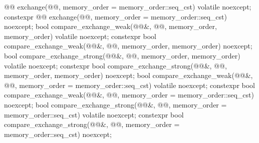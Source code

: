 \begin{codeblock}
{{    @@ exchange(@@,
                           memory_order = memory_order::seq_cst) volatile noexcept;
    constexpr @@ exchange(@@,
                           memory_order = memory_order::seq_cst) noexcept;
    bool compare_exchange_weak(@@&, @@,
                               memory_order, memory_order) volatile noexcept;
    constexpr bool compare_exchange_weak(@@&, @@,
                               memory_order, memory_order) noexcept;
    bool compare_exchange_strong(@@&, @@,
                                 memory_order, memory_order) volatile noexcept;
    constexpr bool compare_exchange_strong(@@&, @@,
                                 memory_order, memory_order) noexcept;
    bool compare_exchange_weak(@@&, @@,
                               memory_order = memory_order::seq_cst) volatile noexcept;
    constexpr bool compare_exchange_weak(@@&, @@,
                               memory_order = memory_order::seq_cst) noexcept;
    bool compare_exchange_strong(@@&, @@,
                                 memory_order = memory_order::seq_cst) volatile noexcept;
    constexpr bool compare_exchange_strong(@@&, @@,
                                 memory_order = memory_order::seq_cst) noexcept;

}}
\end{codeblock}
